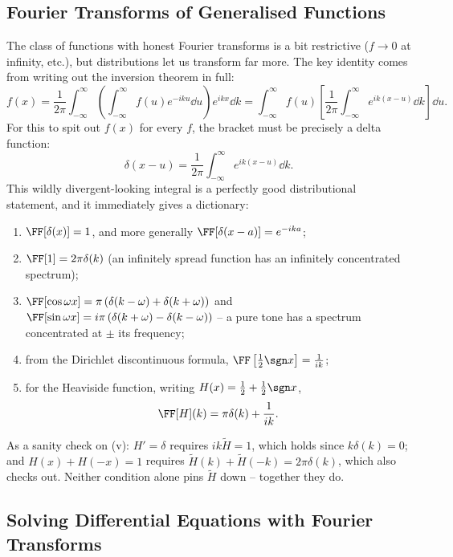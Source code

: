 \subsection{Fourier Transforms of Generalised Functions}

The class of functions with honest Fourier transforms is a bit restrictive ($f \to 0$ at infinity, etc.), but distributions let us transform far more. The key identity comes from writing out the inversion theorem in full:
$$
f(x) = \frac{1}{2\pi} \int_{-\infty}^{\infty} \left(\int_{-\infty}^{\infty} f(u) e^{-iku} \dd u \right) e^{ikx} \dd k = \int_{-\infty}^{\infty} f(u) \left[\frac{1}{2\pi} \int_{-\infty}^{\infty} e^{ik(x - u)} \dd k\right] \dd u.
$$
For this to spit out $f(x)$ for every $f$, the bracket must be precisely a delta function:
$$
\delta(x - u) = \frac{1}{2\pi}\int_{-\infty}^{\infty} e^{ik(x - u)} \dd k.
$$
This wildly divergent-looking integral is a perfectly good distributional statement, and it immediately gives a dictionary:
\begin{enumerate}[label=(\roman*)]
    \item $\FF[\delta(x)] = 1$, and more generally $\FF[\delta(x - a)] = e^{-ika}$;
    \item $\FF[1] = 2 \pi \delta(k)$ (an infinitely spread function has an infinitely concentrated spectrum);
    \item $\FF[\cos \omega x] = \pi \left(\delta(k - \omega) + \delta(k + \omega)\right)$ and $\FF[\sin \omega x] = i\pi\left(\delta(k + \omega) - \delta(k - \omega)\right)$ -- a pure tone has a spectrum concentrated at $\pm$ its frequency;
    \item from the Dirichlet discontinuous formula, $\FF\left[\frac{1}{2}\sgn x \right] = \frac{1}{ik}$;
    \item for the Heaviside function, writing $H(x) = \frac{1}{2} + \frac{1}{2}\sgn x$,
    $$
    \FF[H](k) = \pi \delta(k) + \frac{1}{ik}.
    $$
\end{enumerate}
As a sanity check on (v): $H' = \delta$ requires $ik \tilde{H} = 1$, which holds since $k \delta(k) = 0$; and $H(x) + H(-x) = 1$ requires $\tilde H(k) + \tilde H(-k) = 2\pi \delta(k)$, which also checks out. Neither condition alone pins $\tilde H$ down -- together they do.

\subsection{Solving Differential Equations with Fourier Transforms}

